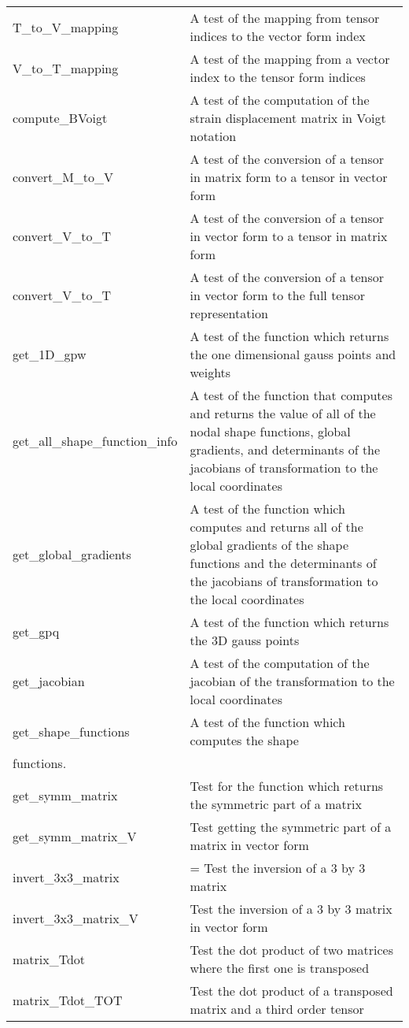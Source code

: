 \documentclass{asme2ej}
\begin{document}
\begin{longtable}{ p{}  p{} }
T\_to\_V\_mapping & A test of the mapping from tensor indices to the vector form index\\
V\_to\_T\_mapping & A test of the mapping from a vector index to the tensor form indices\\
compute\_BVoigt & A test of the computation of the strain displacement matrix in Voigt notation\\
convert\_M\_to\_V & A test of the conversion of a tensor in matrix form to a tensor in vector form\\
convert\_V\_to\_T & A test of the conversion of a tensor in vector form to a tensor in matrix form\\
convert\_V\_to\_T & A test of the conversion of a tensor in vector form to the full tensor representation\\
get\_1D\_gpw & A test of the function which returns the one dimensional gauss points and weights\\
get\_all\_shape\_function\_info & A test of the function that computes and returns the value of all of the nodal shape functions, global gradients, and determinants of the jacobians of transformation to the local coordinates\\
get\_global\_gradients & A test of the function which computes and returns all of the global gradients of the shape functions and the determinants of the jacobians of transformation to the local coordinates\\
get\_gpq & A test of the function which returns the 3D gauss points\\
get\_jacobian & A test of the computation of the jacobian of the transformation to the local coordinates\\
get\_shape\_functions & A test of the function which computes the shape\\ functions.\\
get\_symm\_matrix & Test for the function which returns the symmetric part of a matrix\\
get\_symm\_matrix\_V & Test getting the symmetric part of a matrix in vector form\\
invert\_3x3\_matrix &= Test the inversion of a 3 by 3 matrix\\
invert\_3x3\_matrix\_V & Test the inversion of a 3 by 3 matrix in vector form\\
matrix\_Tdot & Test the dot product of two matrices where the first one is transposed\\
matrix\_Tdot\_TOT & Test the dot product of a transposed matrix and a third order tensor\\

\end{longtable}
\end{document}
